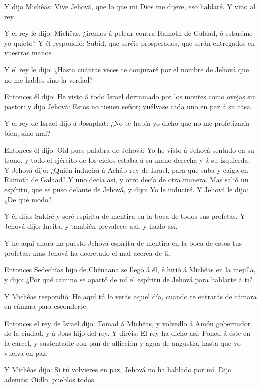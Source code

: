  Y dijo Michêas: Vive Jehová, que lo que mi Dios me dijere,
eso hablaré. Y vino al rey.

 Y el rey le dijo: Michêas, ¿iremos á pelear contra Ramoth
de Galaad, ó estaréme yo quieto? Y él respondió: Subid, que seréis
prosperados, que serán entregados en vuestras manos.

 Y el rey le dijo: ¿Hasta cuántas veces te conjuraré por el
nombre de Jehová que no me hables sino la verdad?

 Entonces él dijo: He visto á todo Israel derramado por los
montes como ovejas sin pastor: y dijo Jehová: Estos no tienen señor;
vuélvase cada uno en paz á su casa.

 Y el rey de Israel dijo á Josaphat: ¿No te había yo dicho
que no me profetizaría bien, sino mal?

 Entonces él dijo: Oid pues palabra de Jehová: Yo he visto
á Jehová sentado en su trono, y todo el ejército de los cielos estaba á
su mano derecha y á su izquierda.  Y Jehová dijo: ¿Quién
inducirá á Achâb rey de Israel, para que suba y caiga en Ramoth de
Galaad? Y uno decía así, y otro decía de otra manera.  Mas
salió un espíritu, que se puso delante de Jehová, y dijo: Yo le
induciré. Y Jehová le dijo: ¿De qué modo?

 Y él dijo: Saldré y seré espíritu de mentira en la boca de
todos sus profetas. Y Jehová dijo: Incita, y también prevalece: sal, y
hazlo así.

 Y he aquí ahora ha puesto Jehová espíritu de mentira en la
boca de estos tus profetas; mas Jehová ha decretado el mal acerca de ti.

 Entonces Sedechîas hijo de Chênaana se llegó á él, é hirió
á Michêas en la mejilla, y dijo: ¿Por qué camino se apartó de mí el
espíritu de Jehová para hablarte á ti?

 Y Michêas respondió: He aquí tú lo verás aquel día, cuando
te entrarás de cámara en cámara para esconderte.

 Entonces el rey de Israel dijo: Tomad á Michêas, y
volvedlo á Amón gobernador de la ciudad, y á Joas hijo del rey.
 Y diréis: El rey ha dicho así: Poned á éste en la cárcel,
y sustentadle con pan de aflicción y agua de angustia, hasta que yo
vuelva en paz.

 Y Michêas dijo: Si tú volvieres en paz, Jehová no ha
hablado por mí. Dijo además: Oidlo, pueblos todos.

